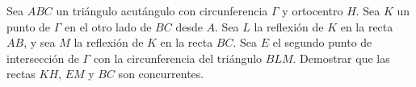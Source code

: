 Sea $ABC$ un triángulo acutángulo con circunferencia $\Gamma$ y ortocentro $H$. Sea $K$ un punto de $\Gamma$ en el otro lado de $BC$ desde $A$. Sea $L$ la reflexión de $K$ en la recta $AB$, y sea $M$ la reflexión de $K$ en la recta $BC$. Sea $E$ el segundo punto de intersección de $\Gamma$ con la circunferencia del triángulo $BLM$.
Demostrar que las rectas $KH$, $EM$ y $BC$ son concurrentes. 